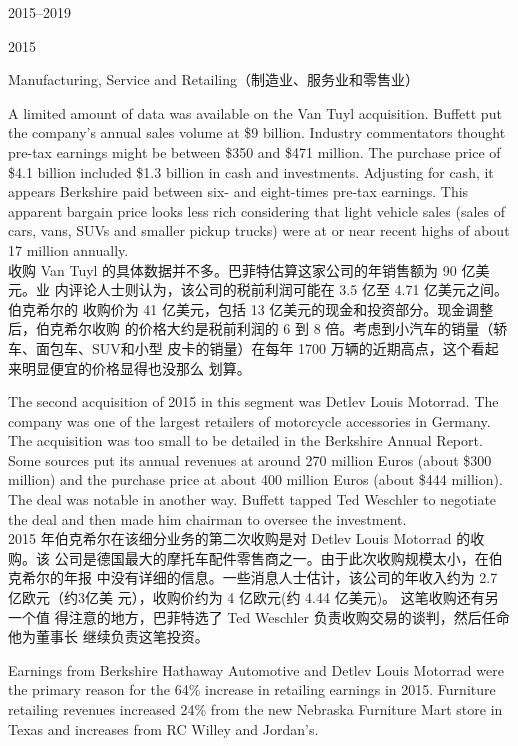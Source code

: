 \begin{chapter}{2015--2019}
\begin{section}{2015}
\begin{subsection}{Manufacturing, Service and Retailing（制造业、服务业和零售业）}
\begin{verseparallel}
  {
    A limited amount of data was available on the Van Tuyl acquisition. Buffett
    put the company’s annual sales volume at \$9 billion. Industry commentators
    thought pre-tax earnings might be between \$350 and \$471 million.
     The purchase price of \$4.1 billion included \$1.3 billion in
    cash and investments. Adjusting for cash, it appears Berkshire paid between
    six- and eight-times pre-tax earnings. This apparent bargain price looks
    less rich considering that light vehicle sales (sales of cars, vans, SUVs
    and smaller pickup trucks) were at or near recent highs of about 17 million
    annually.  \\
  }
  {
    收购 Van Tuyl 的具体数据并不多。巴菲特估算这家公司的年销售额为 90 亿美元。业
    内评论人士则认为，该公司的税前利润可能在 3.5 亿至 4.71 亿美元之间。伯克希尔的
    收购价为 41 亿美元，包括 13 亿美元的现金和投资部分。现金调整后，伯克希尔收购
    的价格大约是税前利润的 6 到 8 倍。考虑到小汽车的销量（轿车、面包车、SUV和小型
    皮卡的销量）在每年 1700 万辆的近期高点，这个看起来明显便宜的价格显得也没那么
    划算。
  }
\end{verseparallel}

\begin{verseparallel}
  {
    The second acquisition of 2015 in this segment was Detlev Louis Motorrad.
    The company was one of the largest retailers of motorcycle accessories in
    Germany. The acquisition was too small to be detailed in the Berkshire
    Annual Report. Some sources put its annual revenues at around 270 million
    Euros (about \$300 million) and the purchase price at about 400 million
    Euros (about \$444 million).  The deal was notable in another way.
    Buffett tapped Ted Weschler to negotiate the deal and then made him chairman
    to oversee the investment. \\
  }
  {
    2015 年伯克希尔在该细分业务的第二次收购是对 Detlev Louis Motorrad 的收购。该
    公司是德国最大的摩托车配件零售商之一。由于此次收购规模太小，在伯克希尔的年报
    中没有详细的信息。一些消息人士估计，该公司的年收入约为 2.7 亿欧元（约3亿美
    元），收购价约为 4 亿欧元(约 4.44 亿美元)。  这笔收购还有另一个值
    得注意的地方，巴菲特选了 Ted Weschler 负责收购交易的谈判，然后任命他为董事长
    继续负责这笔投资。
  }
\end{verseparallel}

\begin{verseparallel}
  {
    Earnings from Berkshire Hathaway Automotive and Detlev Louis Motorrad were
    the primary reason for the 64\% increase in retailing earnings in 2015.
    Furniture retailing revenues increased 24\% from the new Nebraska Furniture
    Mart store in Texas and increases from RC Willey and Jordan’s. \\
  }
  {

}
\end{verseparallel}
\end{subsection}
\end{section}
\end{chapter}
